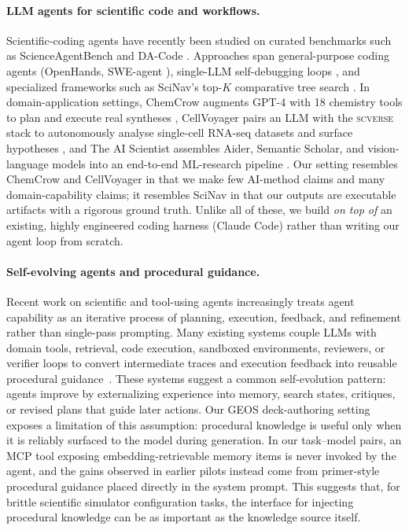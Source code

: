 \documentclass{article}
\begin{document}
\paragraph{LLM agents for scientific code and workflows.}
Scientific-coding agents have recently been studied on curated benchmarks such as ScienceAgentBench and DA-Code \cite{chen2025scienceagentbench,huang2024dacode}. Approaches span general-purpose coding agents (OpenHands, SWE-agent \cite{wang2024openhands,yang2024sweagent}), single-LLM self-debugging loops \cite{chen2024selfdebug}, and specialized frameworks such as SciNav's top-$K$ comparative tree search \cite{zhang2026scinav}. In domain-application settings, ChemCrow augments GPT-4 with 18 chemistry tools to plan and execute real syntheses \cite{bran2024chemcrow}, CellVoyager pairs an LLM with the \textsc{scverse} stack to autonomously analyse single-cell RNA-seq datasets and surface hypotheses \cite{alber2025cellvoyager}, and The AI Scientist assembles Aider, Semantic Scholar, and vision-language models into an end-to-end ML-research pipeline \cite{lu2024aiscientist}. Our setting resembles ChemCrow and CellVoyager in that we make few AI-method claims and many domain-capability claims; it resembles SciNav in that our outputs are executable artifacts with a rigorous ground truth. Unlike all of these, we build \emph{on top of} an existing, highly engineered coding harness (Claude Code) rather than writing our agent loop from scratch.

\paragraph{Self-evolving agents and procedural guidance.}
Recent work on scientific and tool-using agents increasingly treats agent capability as an iterative process of planning, execution, feedback, and refinement rather than single-pass prompting. Many existing systems couple LLMs with domain tools, retrieval, code execution, sandboxed environments, reviewers, or verifier loops to convert intermediate traces and execution feedback into reusable procedural guidance~\citep{bran2024chemcrow,boiko2023coscientist,alber2025cellvoyager,lu2024aiscientist,zhang2026scinav,li2026agentflow,tang2026eigenagent,narayanan2024aviary}. These systems suggest a common self-evolution pattern: agents improve by externalizing experience into memory, search states, critiques, or revised plans that guide later actions. Our GEOS deck-authoring setting exposes a limitation of this assumption: procedural knowledge is useful only when it is reliably surfaced to the model during generation. In our task--model pairs, an MCP tool exposing embedding-retrievable memory items is never invoked by the agent, and the gains observed in earlier pilots instead come from primer-style procedural guidance placed directly in the system prompt. This suggests that, for brittle scientific simulator configuration tasks, the interface for injecting procedural knowledge can be as important as the knowledge source itself.
\end{document}
